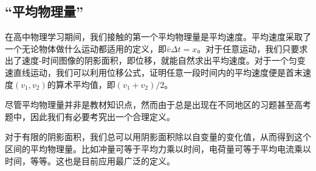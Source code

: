 \subsection{“平均物理量”}
在高中物理学习期间，我们接触的第一个平均物理量是平均速度。平均速度采取了一个无论物体做什么运动都适用的定义，即$\bar v\Delta t=x$。对于任意运动，我们只要求出了速度-时间图像的阴影面积，即位移，就能自然求出平均速度。对于一个匀变速直线运动，我们可以利用位移公式，证明任意一段时间内的平均速度便是首末速度$(v_1,v_2)$的算术平均值，即$(v_1+v_2)/2$。

尽管平均物理量并非是教材知识点，然而由于总是出现在不同地区的习题甚至高考题中，因此我们有必要考究出一个合理定义。

对于有限的阴影面积，我们总可以用阴影面积除以自变量的变化值，从而得到这个区间的平均物理量。比如冲量可等于平均力乘以时间，电荷量可等于平均电流乘以时间，等等。这也是目前应用最广泛的定义。


